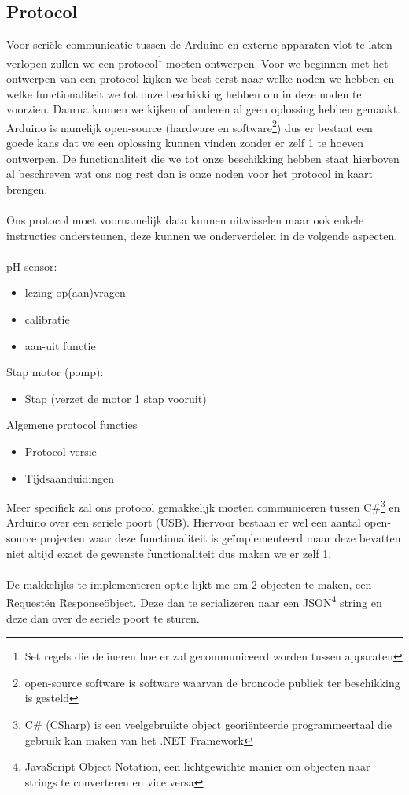 \documentclass[10pt,twoside]{report}
\begin{document}
\subsection{Protocol}
Voor seriële communicatie tussen de Arduino en externe apparaten vlot te laten verlopen zullen we een protocol\footnote{Set regels die defineren hoe er zal gecommuniceerd worden tussen apparaten} moeten ontwerpen.
Voor we beginnen met het ontwerpen van een protocol kijken we best eerst naar welke noden we hebben en welke functionaliteit we tot onze beschikking hebben om in deze noden te voorzien. Daarna kunnen we kijken of anderen al geen oplossing hebben gemaakt. Arduino is namelijk open-source (hardware en software\footnote{open-source software is software waarvan de broncode publiek ter beschikking is gesteld}) dus er bestaat een goede kans dat we een oplossing kunnen vinden zonder er zelf 1 te hoeven ontwerpen. De functionaliteit die we tot onze beschikking hebben staat hierboven al beschreven wat ons nog rest dan is onze noden voor het protocol in kaart brengen.
\\\\
Ons protocol moet voornamelijk data kunnen uitwisselen maar ook enkele instructies ondersteunen, deze kunnen we onderverdelen in de volgende aspecten.
\\\\
pH sensor:
\begin{itemize}
    \item lezing op(aan)vragen
    \item calibratie
    \item aan-uit functie
\end{itemize}
Stap motor (pomp):
\begin{itemize}
    \item Stap (verzet de motor 1 stap vooruit)
\end{itemize}
Algemene protocol functies
\begin{itemize}
    \item Protocol versie
    \item Tijdsaanduidingen
\end{itemize}
Meer specifiek zal ons protocol gemakkelijk moeten communiceren tussen C\#\footnote{C\# (CSharp) is een veelgebruikte object georiënteerde programmeertaal die gebruik kan maken van het .NET Framework} en Arduino over een seriële poort (USB). Hiervoor bestaan er wel een aantal open-source projecten waar deze functionaliteit is geïmplementeerd maar deze bevatten niet altijd exact de gewenste functionaliteit dus maken we er zelf 1.\\\\
De makkelijks te implementeren optie lijkt me om 2 objecten te maken, een \"Request\" en \"Response\" object. Deze dan te serializeren naar een JSON\footnote{JavaScript Object Notation, een lichtgewichte manier om objecten naar strings te converteren en vice versa} string en deze dan over de seriële poort te sturen.
\end{document}
